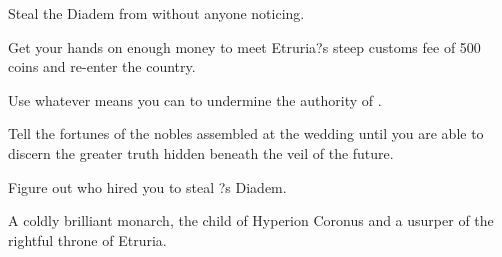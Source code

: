 \documentclass[char]{Kos}
\begin{document}
\begin{itemz}[Goals]
\item Steal the Diadem from \cMerchant{} without anyone noticing.
\item Get your hands on enough money to meet Etruria?s steep customs fee of 500 coins and re-enter the country.
\item Use whatever means you can to undermine the authority of \cEtruriaKing{\Monarch} \cEtruriaKing{}.
\item Tell the fortunes of the nobles assembled at the wedding until you are able to discern the greater truth hidden beneath the veil of the future.
\item Figure out who hired you to steal \cMerchant{}?s Diadem.
\end{itemz}

\begin{contacts}
\contact{\cEtruriaKing{}} A coldly brilliant monarch, the child of Hyperion Coronus and a usurper of the rightful throne of Etruria.
\end{contacts}
\end{document}
